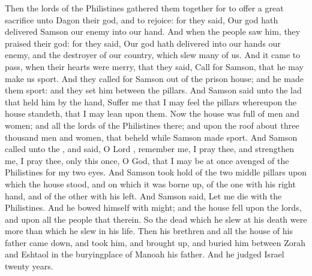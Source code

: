 {Then the
lords of the
Philistines gathered them
together for to
offer a
great
sacrifice unto
Dagon their
god, and to
rejoice: for they
said, Our
god hath
delivered
Samson our
enemy into our
hand.
And when the
people
saw him, they
praised their
god: for they
said, Our
god hath
delivered into our
hands our
enemy, and the
destroyer of our
country, which
slew
many of us.
And it came to pass, when their
hearts were
merry, that they
said,
Call for
Samson, that he may make us
sport. And they
called for
Samson out of the
prison
house; and he made
them
sport: and they
set him between the
pillars.
And
Samson
said unto the
lad that
held him by the
hand,
Suffer me that I may
feel the
pillars whereupon the
house
standeth, that I may
lean upon them.
Now the
house was
full of
men and
women; and all the
lords of the
Philistines
{} there; and
{} upon the
roof about
three
thousand
men and
women, that
beheld while
Samson made
sport.
And
Samson
called unto the
{}, and
said, O
Lord
{},
remember me, I pray thee, and
strengthen me, I pray thee, only this
once, O
God, that I may be at
once
avenged of the
Philistines for my
two
eyes.
And
Samson took
hold of the
two
middle
pillars upon which the
house
stood, and on which it was borne
up, of the
one with his right
hand, and of the
other with his
left.
And
Samson
said, Let me
die with the
Philistines. And he
bowed himself with
{}
might; and the
house
fell upon the
lords, and upon all the
people that
{} therein. So the
dead which he
slew at his
death were
more than
{} which he
slew in his
life.
Then his
brethren and all the
house of his
father came
down, and
took him, and brought
{}
up, and
buried him between
Zorah and
Eshtaol in the
buryingplace of
Manoah his
father. And he
judged
Israel
twenty
years.

}
